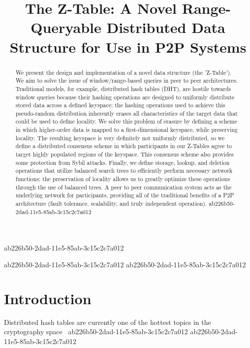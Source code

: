 \documentclass[12pt]{article}
\title{The Z-Table: A Novel Range-Queryable Distributed Data Structure for Use in P2P Systems}
\begin{document}
ab226b50-2dad-11e5-85ab-3c15c2c7a012
\maketitle
ab226b50-2dad-11e5-85ab-3c15c2c7a012
ab226b50-2dad-11e5-85ab-3c15c2c7a012\begin{abstract}
We present the design and implementation of a novel data structure (the 'Z-Table'). We aim to solve the issue of window/range-based queries in peer to peer architectures. Traditional models, for example,  distributed hash tables (DHT), are hostile towards window queries because their hashing operations are designed to uniformly distribute stored data across a defined keyspace; the hashing operations used to achieve this pseudo-random distribution inherently erases all characteristics of the target data that could be used to define locality. We solve this problem of erasure by defining a scheme in which higher-order data is mapped to a first-dimensional keyspace, while preserving locality. The resulting keyspace is very definitely not uniformly distributed, so we define a distributed consensus scheme in which participants in our Z-Tables agree to target highly populated regions of the keyspace. This consensus scheme also provides some protection from Sybil attacks. Finally, we define storage, lookup, and deletion operations that utilize balanced search trees to efficiently perform necessary network functions; the preservation of locality allows us to greatly optimize these operations through the use of balanced trees. A peer to peer communication system acts as the underlying network for participants, providing all of the traditional benefits of a P2P architecture (fault tolerance, scalability, and truly independent operation).
ab226b50-2dad-11e5-85ab-3c15c2c7a012\end{abstract}


\newpage
\section{Introduction}
Distributed hash tables are currently one of the hottest topics in the cryptography space~\cite{Stoica:2001dj,Rowstron:2001ea,Ratnasamy:2001wn}
ab226b50-2dad-11e5-85ab-3c15c2c7a012
ab226b50-2dad-11e5-85ab-3c15c2c7a012\printbibliography
\end{document}
